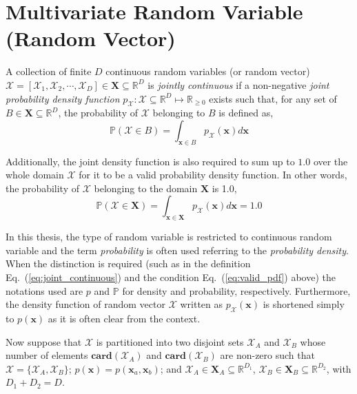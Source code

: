 \section{Multivariate Random Variable (Random Vector)}\label{app:probability}

A collection of finite $D$ continuous random variables (or random vector) $\bm{\mathcal{X}} = [\mathcal{X}_1, \mathcal{X}_2, \cdots, \mathcal{X}_D] \in \boldsymbol{X} \subseteq \mathbb{R}^D$ is \emph{jointly continuous} if a non-negative \emph{joint probability density function} $p_{\bm{\mathcal{X}}}: \bm{\mathcal{X}} \subseteq \mathbb{R}^D \mapsto \mathbb{R}_{\geq 0}$ exists such that, for any set of $B \in \boldsymbol{X} \subseteq \mathbb{R}^D$, the probability of $\bm{\mathcal{X}}$ belonging to $B$ is defined as,
\begin{equation}
  \mathbb{P} (\bm{\mathcal{X}} \in B) = \int_{\bm{x} \in B} p_{\bm{\mathcal{X}}} (\bm{x}) d\bm{x}
\label{eq:joint_continuous}
\end{equation}

Additionally,
the joint density function is also required to sum up to $1.0$ over the whole domain $\bm{\mathcal{X}}$ for it to be a valid probability density function.
In other words, the probability of $\bm{\mathcal{X}}$ belonging to the domain $\boldsymbol{X}$ is 1.0,
\begin{equation}
  \mathbb{P} (\bm{\mathcal{X}} \in \boldsymbol{X}) = \int_{\bm{x} \in \boldsymbol{X}} p_{\bm{\mathcal{X}}} (\bm{x}) d\bm{x} = 1.0
\label{eq:valid_pdf}
\end{equation}

In this thesis,
the type of random variable is restricted to continuous random variable and the term \emph{probability} is often used referring to the \emph{probability density}.
When the distinction is required (such as in the definition Eq.~(\ref{eq:joint_continuous}) and the condition Eq.~(\ref{eq:valid_pdf}) above) the notations used are $p$ and $\mathbb{P}$ for density and probability, respectively.
Furthermore, the density function of random vector $\bm{\mathcal{X}}$ written as $p_{\bm{\mathcal{X}}} (\bm{x})$ is shortened simply to $p (\bm{x})$ as it is often clear from the context.

Now suppose that $\bm{\mathcal{X}}$ is partitioned into two disjoint sets $\bm{\mathcal{X}}_A$ and $\bm{\mathcal{X}}_B$ whose number of elements $\mathbf{card}(\bm{\mathcal{X}}_A)$ and $\mathbf{card}(\bm{\mathcal{X}}_B)$ are non-zero such that $\bm{\mathcal{X}} = \{\bm{\mathcal{X}}_A, \bm{\mathcal{X}}_B\}$; 
$p(\bm{x}) = p(\bm{x}_a,\bm{x}_b)$; 
and $\bm{\mathcal{X}}_A \in \boldsymbol{X}_A \subseteq \mathbb{R}^{D_1}$, $\bm{\mathcal{X}}_B \in \boldsymbol{X}_B \subseteq \mathbb{R}^{D_2}$, with $D_1 + D_2 = D$.
  
